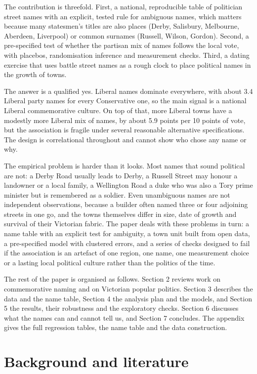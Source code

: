 \documentclass[11pt,a4paper]{article}
\begin{document}
The contribution is threefold. First, a national, reproducible table of politician street names with an explicit, tested rule for ambiguous names, which matters because many statesmen's titles are also places (Derby, Salisbury, Melbourne, Aberdeen, Liverpool) or common surnames (Russell, Wilson, Gordon). Second, a pre-specified test of whether the partisan mix of names follows the local vote, with placebos, randomisation inference and measurement checks. Third, a dating exercise that uses battle street names as a rough clock to place political names in the growth of towns.

The answer is a qualified yes. Liberal names dominate everywhere, with about 3.4 Liberal party names for every Conservative one, so the main signal is a national Liberal commemorative culture. On top of that, more Liberal towns have a modestly more Liberal mix of names, by about 5.9 points per 10 points of vote, but the association is fragile under several reasonable alternative specifications. The design is correlational throughout and cannot show who chose any name or why.

The empirical problem is harder than it looks. Most names that sound political are not: a Derby Road usually leads to Derby, a Russell Street may honour a landowner or a local family, a Wellington Road a duke who was also a Tory prime minister but is remembered as a soldier. Even unambiguous names are not independent observations, because a builder often named three or four adjoining streets in one go, and the towns themselves differ in size, date of growth and survival of their Victorian fabric. The paper deals with these problems in turn: a name table with an explicit test for ambiguity, a town unit built from open data, a pre-specified model with clustered errors, and a series of checks designed to fail if the association is an artefact of one region, one name, one measurement choice or a lasting local political culture rather than the politics of the time.

The rest of the paper is organised as follows. Section 2 reviews work on commemorative naming and on Victorian popular politics. Section 3 describes the data and the name table, Section 4 the analysis plan and the models, and Section 5 the results, their robustness and the exploratory checks. Section 6 discusses what the names can and cannot tell us, and Section 7 concludes. The appendix gives the full regression tables, the name table and the data construction.

\section{Background and literature}
\end{document}

